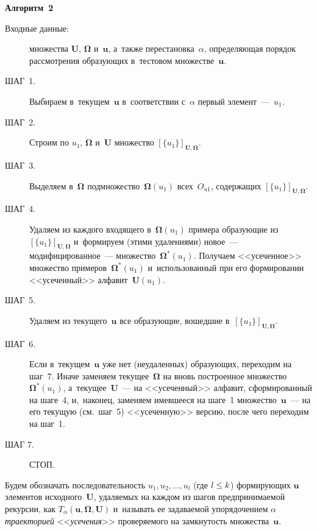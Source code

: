 \begin{multicols}{2}
\noindent
\textbf{Алгоритм~2}
\begin{description}
\item[Входные данные:] множества $\mathbf{U}$, ${\boldsymbol{\Omega}}$ 
и~$\mathbf{u}$, 
а~также перестановка~$\alpha$, определяющая порядок рас\-смот\-ре\-ния 
образующих в~тестовом множестве~$\mathbf{u}$.

\item[ШАГ~1.] Выбираем в~текущем~$\mathbf{u}$ в~соответствии с~$\alpha$ 
первый элемент~---~$u_1$.

\item[ШАГ~2.] Строим по $u_1$, ${\boldsymbol{\Omega}}$ и~$\mathbf{U}$ множество 
$[\{u_1\}]_{\mathbf{U},{\boldsymbol{\Omega}}}$.

\item[ШАГ~3.] Выделяем в~${\boldsymbol{\Omega}}$ подмножество~${\boldsymbol{\Omega}} 
(u_1)$ всех~$O_{u1}$, 
содержащих $[\{u_1\}]_{\mathbf{U},{\boldsymbol{\Omega}}}$.

\item[ШАГ~4.] Удаляем из каждого входящего в~${\boldsymbol{\Omega}} (u_1)$ примера 
образующие из $[\{u_1\}]_{\mathbf{U},{\boldsymbol{\Omega}}}$ и~формируем (этими 
удалениями) новое~--- модифицированное~--- множество~${\boldsymbol{\Omega}}^*(u_1)$. 
Получаем <<усечен\-ное>> множество примеров~${\boldsymbol{\Omega}}^*(u_1)$ 
и~использованный при его формировании <<усеченный>> 
алфавит~$\mathbf{U}(u_1)$.

\item[ШАГ~5.] Удаляем из текущего~$\mathbf{u}$ все образующие, вошедшие 
в~$[\{u_1\}]_{\mathbf{U},{\boldsymbol{\Omega}}}$.

\item[ШАГ~6.] Если в~текущем~$\mathbf{u}$ уже нет (неудаленных) образующих, 
переходим на шаг~7. Иначе заменяем текущее~${\boldsymbol{\Omega}}$ на вновь 
построенное множество~${\boldsymbol{\Omega}}^*(u_1)$, а~текущее~$\mathbf{U}$~--- на 
<<усеченный>> алфавит, сформированный на шаге~4, и,~наконец, заменяем 
имевшееся на шаге~1 множество~$\mathbf{u}$~--- на его текущую (см.\ 
шаг~5) <<усеченную>> версию, после чего переходим на шаг~1.

\item[ШАГ 7.] СТОП.
\end{description}

    Будем обозначать последовательность $u_1, u_2, \ldots, u_l$ (где $l \hm\leq 
k$) формирующих $\mathbf{u}$ элементов исходного~$\mathbf{U}$, 
удаляемых на каждом из шагов предпринимаемой рекурсии, как 
$T_\alpha(\mathbf{u},{\boldsymbol{\Omega}},\mathbf{U})$ и~называть ее задаваемой 
упорядочением $\alpha$ \textit{траекторией} <<\textit{усечения}>> 
проверяемого на замкнутость множества~$\mathbf{u}$.
    

\end{multicols}

